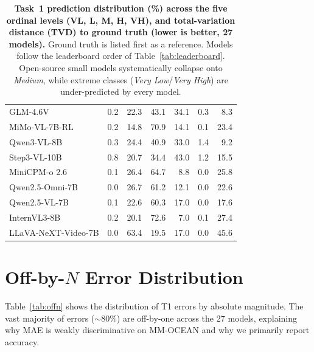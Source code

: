 \documentclass{llmxive}
\providecommand{\benchname}{MM-OCEAN}
\begin{document}
\begin{table}[t]
{\begin{tabular}{lrrrrrr}
GLM-4.6V             &  0.2 & 22.3 & 43.1 & 34.1 &  0.3 &   8.3 \\
MiMo-VL-7B-RL        &  0.2 & 14.8 & 70.9 & 14.1 &  0.1 &  23.4 \\
Qwen3-VL-8B          &  0.3 & 24.4 & 40.9 & 33.0 &  1.4 &   9.2 \\
Step3-VL-10B         &  0.8 & 20.7 & 34.4 & 43.0 &  1.2 &  15.5 \\
MiniCPM-o 2.6        &  0.1 & 26.4 & 64.7 &  8.8 &  0.0 &  25.8 \\
Qwen2.5-Omni-7B      &  0.0 & 26.7 & 61.2 & 12.1 &  0.0 &  22.6 \\
Qwen2.5-VL-7B        &  0.1 & 22.6 & 60.3 & 17.0 &  0.0 &  17.6 \\
InternVL3-8B         &  0.2 & 20.1 & 72.6 &  7.0 &  0.1 &  27.4 \\
LLaVA-NeXT-Video-7B  &  0.0 & 63.4 & 19.5 & 17.0 &  0.0 &  45.6 \\
\bottomrule
\end{tabular}%
}
\caption{\textbf{Task~1 prediction distribution (\%) across the five ordinal levels (VL, L, M, H, VH), and total-variation distance (TVD) to ground truth (lower is better, 27 models).} Ground truth is listed first as a reference. Models follow the leaderboard order of Table~\ref{tab:leaderboard}. Open-source small models systematically collapse onto \emph{Medium}, while extreme classes (\emph{Very Low}/\emph{Very High}) are under-predicted by every model.}
\label{tab:t1_dist}
\end{table}

\section{Off-by-\texorpdfstring{$N$}{N} Error Distribution}
\label{app:offn}
Table~\ref{tab:offn} shows the distribution of T1 errors by absolute magnitude. The vast majority of errors ($\sim\!80\%$) are off-by-one across the 27 models, explaining why MAE is weakly discriminative on \benchname{} and why we primarily report accuracy.
\end{document}
